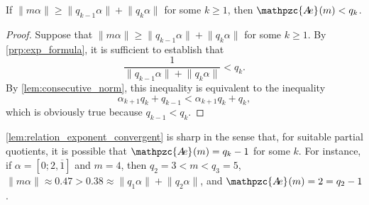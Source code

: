 \documentclass[a4paper,fleqn]{article}
\providecommand{\norm}[1]{\lVert#1\rVert}
\newcommand{\abexp}[2][]{\mathpzc{A\mkern-3mu e}_{#1}(#2)}
\begin{document}
  \begin{lemma}\label{lem:relation_exponent_convergent}
    If $\norm{m\alpha} \geq \norm{q_{k-1}\alpha} + \norm{q_k\alpha}$ for some $k \geq 1$, then $\abexp{m} < q_k$.
  \end{lemma}
  \begin{proof}
    Suppose that $\norm{m\alpha} \geq \norm{q_{k-1}\alpha} + \norm{q_k\alpha}$ for some $k \geq 1$. By
    \autoref{prp:exp_formula}, it is sufficient to establish that
    \begin{equation*}
      \frac{1}{\norm{q_{k-1}\alpha} + \norm{q_k \alpha}} < q_k.
    \end{equation*}
    By \autoref{lem:consecutive_norm}, this inequality is equivalent to the inequality
    \begin{equation*}
      \alpha_{k+1}q_k + q_{k-1} < \alpha_{k+1}q_k + q_k,
    \end{equation*}
    which is obviously true because $q_{k-1} < q_k$.
  \end{proof}

  \autoref{lem:relation_exponent_convergent} is sharp in the sense that, for suitable partial quotients, it is possible
  that $\abexp{m} = q_k - 1$ for some $k$. For instance, if $\alpha = [0; 2, \overline{1}]$ and $m = 4$, then
  $q_2 = 3 < m < q_3 = 5$, $\norm{m\alpha} \approx 0.47 > 0.38 \approx \norm{q_1\alpha} + \norm{q_2\alpha}$, and
  $\abexp{m} = 2 = q_2 - 1$.
\end{document}
